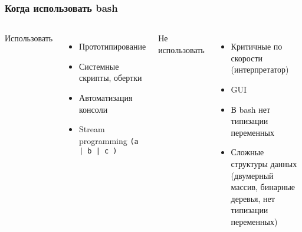 \begin{frame}
  \frametitle{Когда использовать bash}
  \begin{columns}
    \begin{center}
     {\Large Использовать}
    \end{center}
    \begin{itemize}
      \item Прототипирование
      \item Системные скрипты, обертки
      \item Автоматизация консоли
      \item Stream programming \texttt{(a | b | c )}
    \end{itemize}
    \begin{center}
     {\Large Не использовать}
    \end{center}
    \begin{itemize}
      \item Критичные по скорости (интерпретатор)
      \item GUI
      \item В bash нет типизации переменных
      \item Сложные структуры данных (двумерный массив, бинарные деревья, нет типизации переменных)
    \end{itemize}
  \end{columns}
\end{frame}

